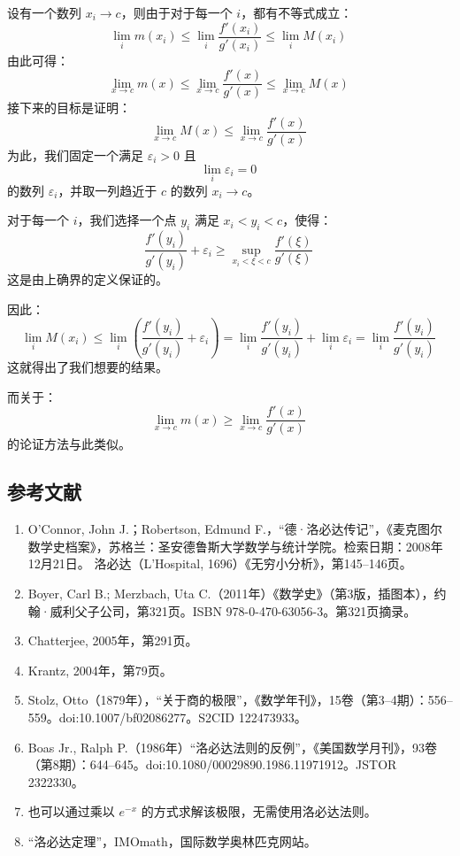 设有一个数列 $x_i \to c$，则由于对于每一个 $i$，都有不等式成立：
$$
\lim_i m(x_i) \leq \lim_i \frac{f'(x_i)}{g'(x_i)} \leq \lim_i M(x_i)~
$$
由此可得：
$$
\lim_{x \to c} m(x) \leq \lim_{x \to c} \frac{f'(x)}{g'(x)} \leq \lim_{x \to c} M(x)~
$$
接下来的目标是证明：
$$
\lim_{x \to c} M(x) \leq \lim_{x \to c} \frac{f'(x)}{g'(x)}~
$$
为此，我们固定一个满足 $\varepsilon_i > 0$ 且
$$
\lim_i \varepsilon_i = 0~
$$
的数列 $\varepsilon_i$，并取一列趋近于 $c$ 的数列 $x_i \to c$。

对于每一个 $i$，我们选择一个点 $y_i$ 满足 $x_i < y_i < c$，使得：
$$
\frac{f'(y_i)}{g'(y_i)} + \varepsilon_i \geq \sup_{x_i < \xi < c} \frac{f'(\xi)}{g'(\xi)}~
$$
这是由上确界的定义保证的。

因此：
$$
\lim_i M(x_i) \leq \lim_i \left( \frac{f'(y_i)}{g'(y_i)} + \varepsilon_i \right)
= \lim_i \frac{f'(y_i)}{g'(y_i)} + \lim_i \varepsilon_i
= \lim_i \frac{f'(y_i)}{g'(y_i)}~
$$
这就得出了我们想要的结果。

而关于：
$$
\lim_{x \to c} m(x) \geq \lim_{x \to c} \frac{f'(x)}{g'(x)}~
$$
的论证方法与此类似。
\subsection{参考文献}
\begin{enumerate}
\item O'Connor, John J.；Robertson, Edmund F.，“德·洛必达传记”，《麦克图尔数学史档案》，苏格兰：圣安德鲁斯大学数学与统计学院。检索日期：2008年12月21日。
洛必达（L'Hospital, 1696）《无穷小分析》，第145–146页。
\item Boyer, Carl B.; Merzbach, Uta C.（2011年）《数学史》（第3版，插图本），约翰·威利父子公司，第321页。ISBN 978-0-470-63056-3。第321页摘录。
\item Chatterjee, 2005年，第291页。
\item Krantz, 2004年，第79页。
\item Stolz, Otto（1879年），“关于商的极限”，《数学年刊》，15卷（第3–4期）：556–559。doi:10.1007/bf02086277。S2CID 122473933。
\item Boas Jr., Ralph P.（1986年）“洛必达法则的反例”，《美国数学月刊》，93卷（第8期）：644–645。doi:10.1080/00029890.1986.11971912。JSTOR 2322330。
\item 也可以通过乘以 $e^{-x}$ 的方式求解该极限，无需使用洛必达法则。
\item “洛必达定理”，IMOmath，国际数学奥林匹克网站。
\end{enumerate}
